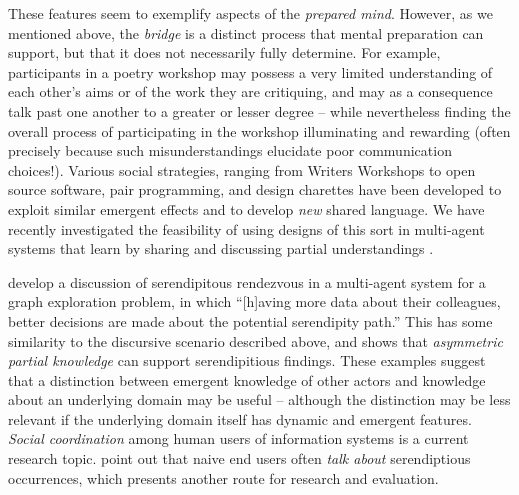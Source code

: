 These features seem to exemplify
aspects of the \emph{prepared mind}.  However, as we mentioned above,
the \emph{bridge} is a distinct process that mental preparation can
support, but that it does not necessarily fully determine.  For example, participants in
a poetry workshop may possess a very limited understanding of each
other's aims or of the work they are critiquing, and may as a
consequence talk past one another to a greater or lesser degree --
while nevertheless finding the overall process of participating in the
workshop illuminating and rewarding (often precisely because
such misunderstandings elucidate poor communication choices!).
Various social strategies, ranging from Writers Workshops to open
source software, pair programming, and design charettes
\cite[p. 11]{gabriel2002writer} have been developed to exploit similar
emergent effects and to develop \emph{new} shared language.  We have
recently investigated the feasibility of using
designs of this sort in multi-agent systems that learn by sharing and
discussing partial understandings \cite{corneli2015computational,corneli2015feedback}.

 develop a discussion of serendipitous
rendezvous in a multi-agent system for a graph exploration problem, in
which ``[h]aving more data about their colleagues, better decisions
are made about the potential serendipity path.''  This has some
similarity to the discursive scenario described above, and shows that
\emph{asymmetric partial knowledge} can support serendipitious
findings.  These examples suggest that a distinction between emergent
knowledge of other actors and knowledge about an underlying domain may
be useful -- although the distinction may be less relevant if
the underlying domain itself has dynamic and emergent features.
\emph{Social coordination} among human users of information systems is
a current research topic.  point out that
naive end users often \emph{talk about} serendiptious occurrences,
which presents another route for research and evaluation.

